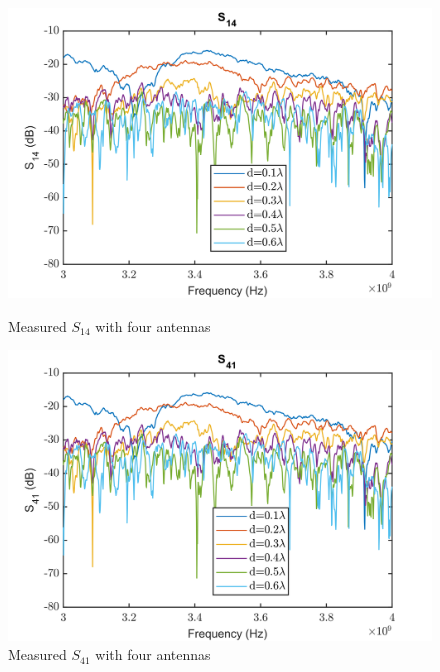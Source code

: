 \begin{figure}[H]
  \centering
  \begin{minipage}[b]{0.5\textwidth}
	\includegraphics[scale = 0.5]{figures/measurement/antennas/spar_four_ant_s14.png}
	\caption{Measured $S_{14}$ with four antennas}
    \label{fig:chamber_four_ant_s14}
  \end{minipage}
  \hfill
  \begin{minipage}[b]{0.4\textwidth}
\includegraphics[scale = 0.5]{figures/measurement/antennas/spar_four_ant_s41.png}
\caption{Measured $S_{41}$ with four antennas}
    \label{fig:chamber_four_ant_s41}
  \end{minipage}
\end{figure}


